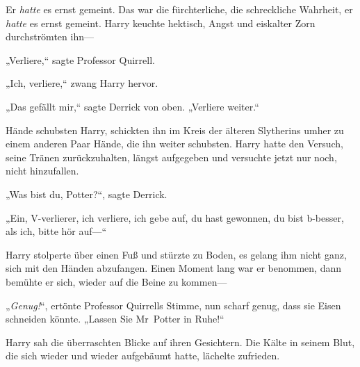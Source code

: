 Er \emph{hatte} es ernst gemeint. Das war die fürchterliche, die schreckliche Wahrheit, er \emph{hatte} es ernst gemeint. Harry keuchte hektisch, Angst und eiskalter Zorn durchströmten ihn—

„Verliere,“ sagte Professor Quirrell.

„Ich, verliere,“ zwang Harry hervor.

„Das gefällt mir,“ sagte Derrick von oben. „Verliere weiter.“

\later

Hände schubsten Harry, schickten ihn im Kreis der älteren Slytherins umher zu einem anderen Paar Hände, die ihn weiter schubsten. Harry hatte den Versuch, seine Tränen zurückzuhalten, längst aufgegeben und versuchte jetzt nur noch, nicht hinzufallen.

„Was bist du, Potter?“, sagte Derrick.

„Ein, V-verlierer, ich verliere, ich gebe auf, du hast gewonnen, du bist b-besser, als ich, bitte hör auf—“

Harry stolperte über einen Fuß und stürzte zu Boden, es gelang ihm nicht ganz, sich mit den Händen abzufangen. Einen Moment lang war er benommen, dann bemühte er sich, wieder auf die Beine zu kommen—

„\emph{Genug!}“, ertönte Professor Quirrells Stimme, nun scharf genug, dass sie Eisen schneiden könnte. „Lassen Sie Mr~Potter in Ruhe!“

Harry sah die überraschten Blicke auf ihren Gesichtern. Die Kälte in seinem Blut, die sich wieder und wieder aufgebäumt hatte, lächelte zufrieden.

